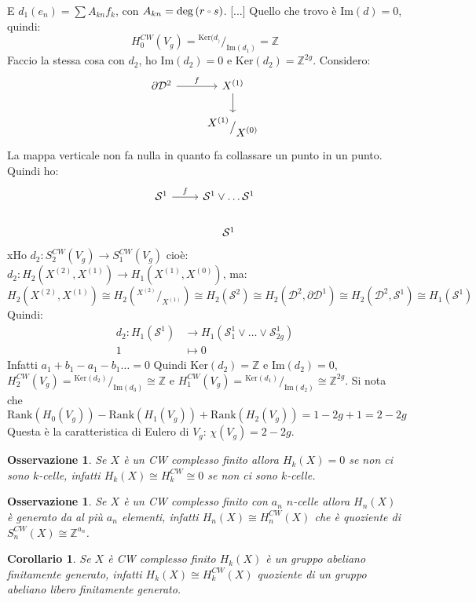 \documentclass[10pt, twoside=false, x11names]{scrbook}
\newtheorem{osservation}[theorem]{Osservazione}
\newtheorem{corollary}[theorem]{Corollario}
\newcommand{\Z}{\mathbb{Z}}
\newcommand{\im}[1]{\mathrm{Im}( #1 )}
\newcommand{\rank}[1]{\mathrm{Rank}( #1 )}
\renewcommand{\ker}[1]{\mathrm{Ker}( #1)}
\newcommand{\Sph}[1][]{\mathcal{S}^#1}
\newcommand{\Disk}[1][]{\mathcal{D}^#1}
\newcommand*\quot[2]{{^{\textstyle #1}\big/_{\textstyle #2}}}
\let\latexcirc=\circ
\newcommand{\ccirc}{\mathbin{\mathchoice
  {\xcirc\scriptstyle}
  {\xcirc\scriptstyle}
  {\xcirc\scriptscriptstyle}
  {\xcirc\scriptscriptstyle}
}}
\newcommand{\xcirc}[1]{\vcenter{\hbox{$#1\latexcirc$}}}
\let\circ\ccirc
\begin{document}
E $ d_1(e_n) = \sum A_{kn}f_k $, con  $ A_{kn} = \deg {(r \circ s)} $.
[...]
Quello che trovo è $ \im{d} = 0 $, quindi:
\[
  H_0^{CW}(V_g) = \quot{\ker{d_}}{\im{d_1}} = \Z
\]
Faccio la stessa cosa con $ d_2 $, ho $ \im{d_2} = 0 $ e $ \ker{d_2} = \Z^{2g} $.
Considero:
\[
  \begin{tikzcd}
    \partial \Disk{2} \rar{f} & X^{(1)} \dar  \\
    {} & \quot{X^{(1)}}{X^{(0)}}
  \end{tikzcd}
\]
La mappa verticale non fa nulla in quanto fa collassare un punto in un punto.
Quindi ho:
\[
  \begin{tikzcd}
    \Sph{1} \rar{f} & \Sph{1} \vee \dots \Sph{1} \\
    {} & \Sph{1}
  \end{tikzcd}
\]
xHo $ d_2 \colon S^{CW}_2(V_g) \to S_1^{CW}(V_g) $ cioè:
$ d_2 \colon H_2(X^{(2)}, X^{(1)}) \to H_1(X^{(1)}, X^{(0)}) $,
ma:
\[
  H_2(X^{(2)}, X^{(1)}) \cong H_2(\quot{X^{(2)}}{X^{(1)}}) \cong H_2(\Sph{2}) \cong H_2(\Disk{2}, \partial \Disk{1})
  \cong H_2(\Disk{2}, \Sph{1}) \cong H_1(\Sph{1})
\]
Quindi:
\begin{align*}
  d_2 \colon H_1(\Sph{1}) & \to H_1(\Sph{1}_1 \vee \dots \vee \Sph{1}_{2g}) \\
  1 & \mapsto 0
\end{align*}
Infatti $ a_1 + b_1 - a_1 - b_1 \dots = 0$
Quindi $ \ker{d_2} = \Z $ e $ \im{d_2} = 0 $,
$ H_2^{CW}(V_g) = \quot{\ker{d_2}}{\im{d_3}} \cong \Z $ e
$ H_1^{CW}(V_g) = \quot{\ker{d_1}}{\im{d_2}} \cong \Z^{2g} $.
Si nota che
\[
  \rank{H_0(V_g)} - \rank{H_1(V_g)} + \rank{H_2(V_g)} = 1 - 2g + 1 = 2 - 2g
\]
Questa è la caratteristica di Eulero di $ V_g $: $ \chi(V_g) = 2 - 2g $.

\begin{osservation}
  Se $ X $ è un CW complesso finito allora $ H_k(X) = 0 $ se non ci sono $ k $-celle,
  infatti $ H_k(X) \cong H_k^{CW} \cong 0 $ se non ci sono $ k $-celle.
\end{osservation}

\begin{osservation}
  Se $ X $ è un CW complesso finito con $ a_n $ $ n $-celle allora $ H_n(X) $
  è generato da al più $ a_n $ elementi, infatti
  $ H_n(X) \cong H_n^{CW}(X) $ che è quoziente di $ S_n^{CW}(X) \cong \Z^{a_n} $.
\end{osservation}

\begin{corollary}
  Se $ X $ è CW complesso finito $ H_k(X) $ è un gruppo abeliano finitamente
  generato, infatti $ H_k(X) \cong H_k^{CW}(X) $ quoziente di un gruppo abeliano
  libero finitamente generato.
\end{corollary}
\end{document}
